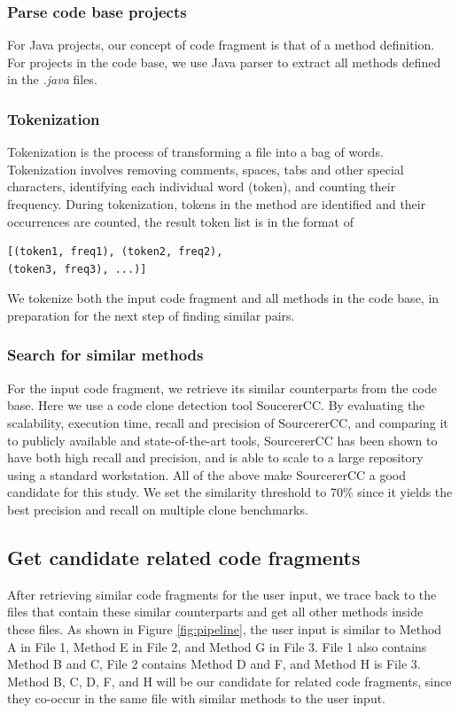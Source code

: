 \subsubsection{Parse code base projects}
For Java projects, our concept of code fragment is that of a method definition. For projects in the code base, we use Java parser to extract all methods defined in the \textit{.java} files.

\subsubsection{Tokenization}
Tokenization is the process of transforming a file into a bag of words. Tokenization involves removing comments, spaces, tabs and other special characters, identifying each individual word (token), and counting their frequency. During tokenization, tokens in the method are identified and their occurrences are counted, the result token list is in the format of 
\begin{lstlisting}
[(token1, freq1), (token2, freq2), 
(token3, freq3), ...)]
\end{lstlisting}
We tokenize both the input code fragment and all methods in the code base, in preparation for the next step of finding similar pairs.

\subsubsection{Search for similar methods}
For the input code fragment, we retrieve its similar counterparts from the code base. Here we use a code clone detection tool SoucererCC. By evaluating the scalability, execution time, recall and precision of SourcererCC, and comparing it to publicly available and state-of-the-art tools, SourcererCC has been shown to have both high recall and precision, and is able to scale to a large repository using a standard workstation. All of the above make SourcererCC a good candidate for this study. We set the similarity threshold to 70\% since it yields the best precision and recall on multiple clone benchmarks.

\subsection{Get candidate related code fragments}
After retrieving similar code fragments for the user input, we trace back to the files that contain these similar counterparts and get all other methods inside these files. As shown in Figure \ref{fig:pipeline}, the user input is similar to Method A in File 1, Method E in File 2, and Method G in File 3. File 1 also contains Method B and C, File 2 contains Method D and F, and Method H is File 3. Method B, C, D, F, and H will be our candidate for related code fragments, since they co-occur in the same file with similar methods to the user input. 

